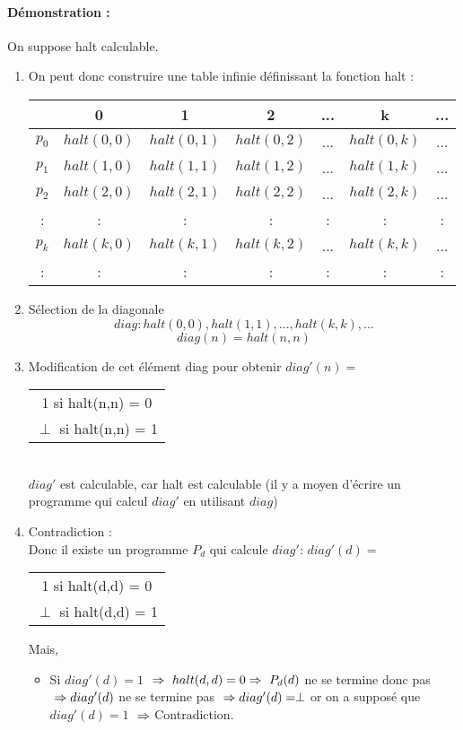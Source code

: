 \paragraph{Démonstration :}
On suppose halt calculable.
\begin{enumerate}
	\item On peut donc construire une table infinie définissant la fonction
		halt : \\
		\begin{tabular}{|c||c|c|c|c|c|c|}
			\hline
			& 0 & 1 & 2 & ... & k & ... \\
			\hline
			$p_0$ & $halt(0,0)$ & $halt(0,1)$ & $halt(0,2)$ & ... & $halt(0,k)$ & ... \\
			$p_1$ & $halt(1,0)$ & $halt(1,1)$ & $halt(1,2)$ & ... & $halt(1,k)$ & ... \\
			$p_2$ & $halt(2,0)$ & $halt(2,1)$ & $halt(2,2)$ & ... & $halt(2,k)$ & ... \\
			: & : &:& : & : & : &:\\
			$p_k$ & $halt(k,0)$ & $halt(k,1)$ & $halt(k,2)$ & ... & $halt(k,k)$ & ... \\
			: & : &:& : & : & : &:\\
			\hline
		\end{tabular}
	\item Sélection de la diagonale
		\[ diag :halt(0,0),halt(1,1),...,halt(k,k),... \]
		\[diag(n) = halt(n,n)\]
	\item Modification de cet élément diag pour obtenir
		$diag'(n) =$
		\begin{tabular}{c}
			1 si halt(n,n) = 0\\
			$\perp$ si halt(n,n) = 1\\
		\end{tabular}\\
		$diag'$ est calculable, car halt est calculable (il y a moyen
		d'écrire un programme qui calcul $diag'$ en utilisant $diag$)
	\item Contradiction :\\
	       	Donc il existe un programme $P_d$ qui calcule
		$diag'$:
		$diag'(d) =$
		\begin{tabular}{c}
			1 si halt(d,d) = 0\\
			$\perp$ si halt(d,d) = 1\\
		\end{tabular}
		Mais,
		\begin{itemize}
			\item Si $diag'(d)= 1$ $\\
			\Rightarrow \  halt(d,d) = 0 \\
			\Rightarrow \ P_d(d)$ ne se termine donc pas $ \\
			\Rightarrow diag'(d)$ ne se termine pas $ \\
			\Rightarrow diag'(d) = \perp$ or on a supposé que $diag'(d) = 1$ $ \\
			\Rightarrow $
			Contradiction.


\end{itemize}
\end{enumerate}

